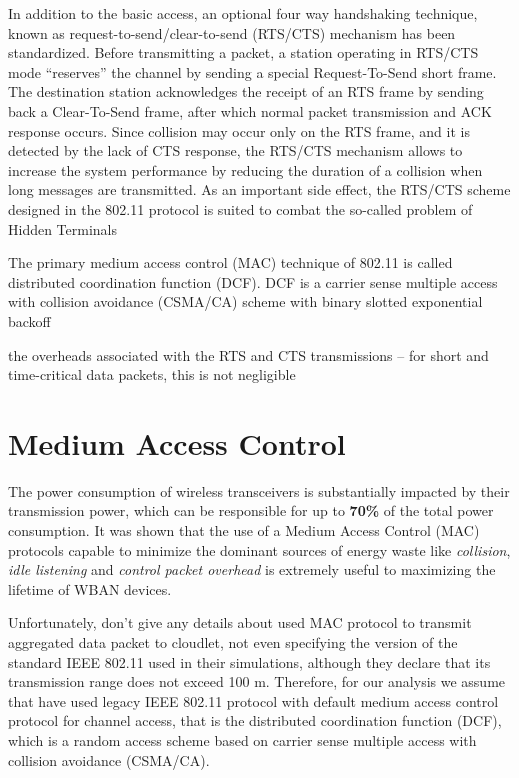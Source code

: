 \documentclass[sigchi]{acmart}
\begin{document}
In addition to the basic access, an optional four way handshaking technique, known as request-to-send/clear-to-send
(RTS/CTS) mechanism has been standardized. Before transmitting a packet, a station operating in RTS/CTS mode “reserves”
the channel by sending a special Request-To-Send short frame.
The destination station acknowledges the receipt of an RTS
frame by sending back a Clear-To-Send frame, after which
normal packet transmission and ACK response occurs. Since
collision may occur only on the RTS frame, and it is detected
by the lack of CTS response, the RTS/CTS mechanism allows
to increase the system performance by reducing the duration
of a collision when long messages are transmitted. As an
important side effect, the RTS/CTS scheme designed in the
802.11 protocol is suited to combat the so-called problem of
Hidden Terminals


 The primary medium access control (MAC) technique of 802.11 is called distributed coordination function (DCF). DCF is a carrier sense multiple access
with collision avoidance (CSMA/CA) scheme with binary slotted
exponential backoff




the overheads associated with
the RTS and CTS transmissions – for short and time-critical data packets, this is not negligible 


\section{Medium Access Control}

The power consumption of wireless transceivers is substantially impacted by their transmission power, which can be responsible for up to \textbf{70\%} of the total power consumption. It was shown that the use of a Medium Access Control (MAC) protocols capable to minimize the dominant sources of energy waste like \textit{collision}, \textit{idle listening} and \textit{control packet overhead} is extremely useful to maximizing the lifetime of WBAN devices.

Unfortunately, \citet{MSAReport} don't give any details about used MAC protocol to transmit aggregated data packet to cloudlet, not even specifying the version of the standard IEEE 802.11 used in their simulations, although they declare that its transmission range does not exceed 100 m. Therefore, for our analysis we assume that \citet{MSAReport} have used legacy IEEE 802.11 protocol with default medium access control protocol for channel access, that is the distributed coordination function (DCF), which is a random access scheme based on carrier sense multiple access with collision avoidance (CSMA/CA).
\end{document}
